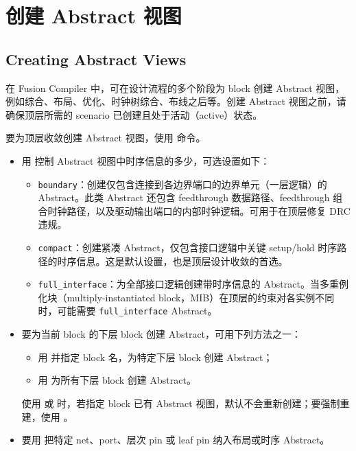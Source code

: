 \section{创建 Abstract 视图}
\subsection*{Creating Abstract Views}

在 Fusion Compiler 中，可在设计流程的多个阶段为 block 创建 Abstract 视图，例如综合、布局、优化、时钟树综合、布线之后等。创建 Abstract 视图之前，请确保顶层所需的 scenario 已创建且处于活动（active）状态。

要为顶层收敛创建 Abstract 视图，使用  命令。
\begin{itemize}
  \item 用  控制 Abstract 视图中时序信息的多少，可选设置如下：
  \begin{itemize}
    \item \texttt{boundary}：创建仅包含连接到各边界端口的边界单元（一层逻辑）的 Abstract。此类 Abstract 还包含 feedthrough 数据路径、feedthrough 组合时钟路径，以及驱动输出端口的内部时钟逻辑。可用于在顶层修复 DRC 违规。
    \item \texttt{compact}：创建紧凑 Abstract，仅包含接口逻辑中关键 setup/hold 时序路径的时序信息。这是默认设置，也是顶层设计收敛的首选。
    \item \texttt{full\_interface}：为全部接口逻辑创建带时序信息的 Abstract。当多重例化块（multiply-instantiated block，MIB）在顶层的约束对各实例不同时，可能需要 \texttt{full\_interface} Abstract。
  \end{itemize}

  \item 要为当前 block 的下层 block 创建 Abstract，可用下列方法之一：
  \begin{itemize}
    \item 用  并指定 block 名，为特定下层 block 创建 Abstract；
    \item 用  为所有下层 block 创建 Abstract。
  \end{itemize}
使用  或  时，若指定 block 已有 Abstract 视图，默认不会重新创建；要强制重建，使用 。

  \item 要用  把特定 net、port、层次 pin 或 leaf pin 纳入布局或时序 Abstract。


\end{itemize}
